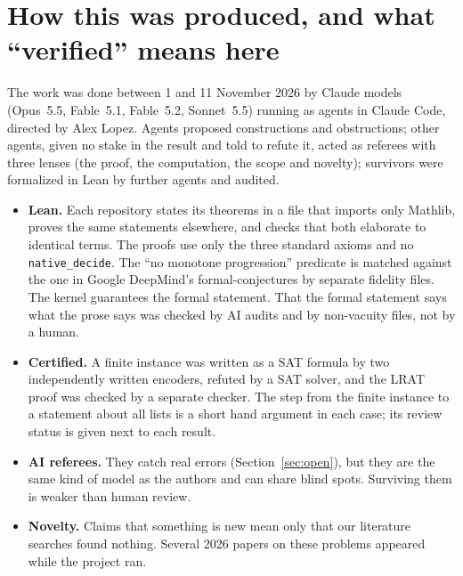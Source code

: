 \documentclass[11pt,letterpaper]{article}
\begin{document}
\section{How this was produced, and what ``verified'' means here}

The work was done between 1 and 11 November 2026 by Claude models (Opus~5.5, Fable~5.1, Fable~5.2,
Sonnet~5.5) running as agents in Claude Code, directed by Alex Lopez. Agents proposed constructions and
obstructions; other agents, given no stake in the result and told to refute it, acted as referees with three
lenses (the proof, the computation, the scope and novelty); survivors were formalized in Lean by further
agents and audited.
\begin{itemize}
\item \textbf{Lean.} Each repository states its theorems in a file that imports only Mathlib, proves the
same statements elsewhere, and checks that both elaborate to identical terms. The proofs use only the three
standard axioms and no \texttt{native\_decide}. The ``no monotone progression'' predicate is matched against
the one in Google DeepMind's formal-conjectures \cite{fc} by separate fidelity files. The kernel guarantees
the formal statement. That the formal statement says what the prose says was checked by AI audits and by
non-vacuity files, not by a human.
\item \textbf{Certified.} A finite instance was written as a SAT formula by two independently written
encoders, refuted by a SAT solver, and the LRAT proof was checked by a separate checker. The step from the
finite instance to a statement about all lists is a short hand argument in each case; its review status is
given next to each result.
\item \textbf{AI referees.} They catch real errors (Section~\ref{sec:open}), but they are the same kind of
model as the authors and can share blind spots. Surviving them is weaker than human review.
\item \textbf{Novelty.} Claims that something is new mean only that our literature searches found nothing.
Several 2026 papers on these problems appeared while the project ran.
\end{itemize}
\end{document}
